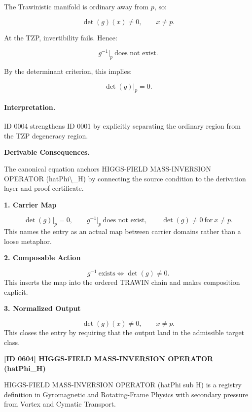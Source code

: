 The Trawinistic manifold is ordinary away from $p$, so:

\begin{equation}
\det(g)(x)\neq 0,
\qquad x\neq p .
\end{equation}

At the TZP, invertibility fails. Hence:

\begin{equation}
g^{-1}\big|_p \ \text{does not exist}.
\end{equation}

By the determinant criterion, this implies:

\begin{equation}
\det(g)\big|_p=0 .
\end{equation}

\paragraph{Interpretation.}
ID 0004 strengthens ID 0001 by explicitly separating the ordinary region from the TZP degeneracy region.

\par\vspace{0.35em}
\noindent\textbf{Derivable Consequences.}\quad
\begingroup
\footnotesize
\raggedright
The canonical equation anchors HIGGS-FIELD MASS-INVERSION OPERATOR (hatPhi\textbackslash{}\_H) by connecting the source condition to the derivation layer and proof certificate.
\par\endgroup

\noindent\textbf{1. Carrier Map}\par
\[
\det(g)\big|_{p}=0, \qquad g^{-1}\big|_{p}\ \text{does not exist}, \qquad \det(g)\neq 0\ \text{for}\ x\neq p.
\]
\noindent This names the entry as an actual map between carrier domains rather than a loose metaphor.\par
\noindent\textbf{2. Composable Action}\par
\[
g^{-1}\ \text{exists} \iff \det(g)\neq 0.
\]
\noindent This inserts the map into the ordered TRAWIN chain and makes composition explicit.\par
\noindent\textbf{3. Normalized Output}\par
\[
\det(g)(x)\neq 0, \qquad x\neq p.
\]
\noindent This closes the entry by requiring that the output land in the admissible target class.\par

\clearpage
\noindent\textbf{[ID 0604] HIGGS-FIELD MASS-INVERSION OPERATOR (hatPhi\_H)}\par
\vspace{0.35em}
\begingroup\small
{}
HIGGS-FIELD MASS-INVERSION OPERATOR (hatPhi sub H) is a registry definition in Gyromagnetic and Rotating-Frame Physics with secondary pressure from Vortex and Cymatic Transport.

